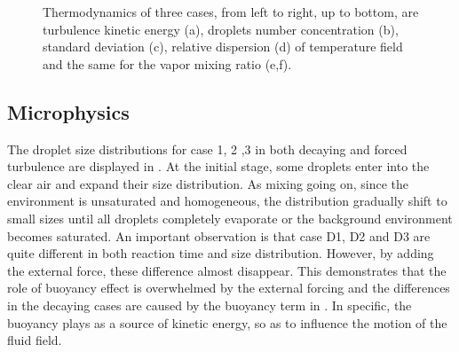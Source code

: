 \begin{figure}[H]\ContinuedFloat
{}
\caption{Thermodynamics of three cases, from left to right, up to bottom, are
turbulence kinetic energy (a), droplets number concentration (b), standard
deviation (c), relative dispersion (d) of temperature field and the same for
the vapor mixing ratio (e,f).}\label{fig:therm_dynam} 
\end{figure}

\subsection{Microphysics}
The droplet size distributions for case 1, 2 ,3 in both decaying and forced
turbulence are displayed in . At the initial stage, some
droplets enter into the clear air and expand their size distribution. As mixing
going on, since the environment is unsaturated and homogeneous, the
distribution gradually shift to small sizes until all droplets completely
evaporate or the background environment becomes saturated.  An important
observation is that case D1, D2 and D3 are quite different in both reaction
time and size distribution. However, by adding the external force, these
difference almost disappear. This demonstrates that the role of buoyancy effect
is overwhelmed by the external forcing and the differences in the decaying
cases are caused by the buoyancy term in . In specific, the
buoyancy plays as a source of kinetic energy, so as to influence the motion of
the fluid field.  

